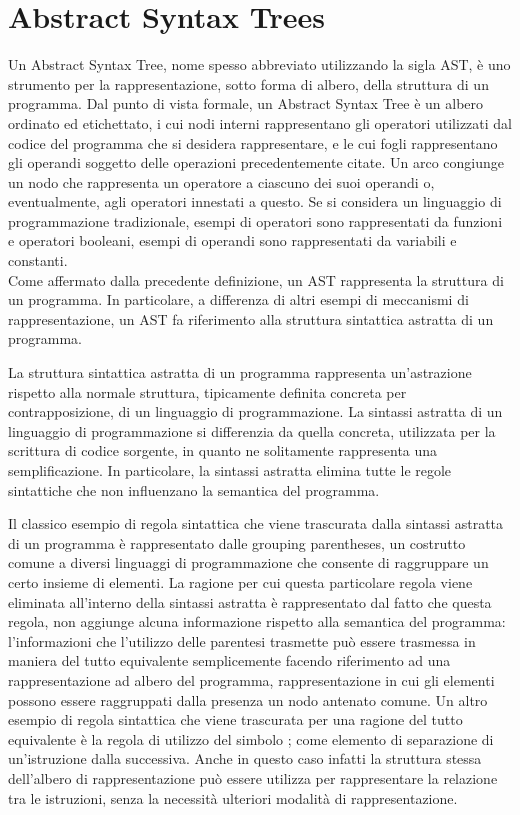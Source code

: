 \section{Abstract Syntax Trees}

Un Abstract Syntax Tree, nome spesso abbreviato utilizzando la sigla AST, è uno
strumento per la rappresentazione, sotto forma di albero, della struttura di un
programma. Dal punto di vista formale, un Abstract Syntax Tree è un albero
ordinato ed etichettato, i cui nodi interni rappresentano gli operatori
utilizzati dal codice del programma che si desidera rappresentare, e le cui
fogli rappresentano gli operandi soggetto delle operazioni precedentemente
citate. Un arco congiunge un nodo che rappresenta un operatore a ciascuno dei
suoi operandi o, eventualmente, agli operatori innestati a questo. Se si
considera un linguaggio di programmazione tradizionale, esempi di operatori
sono rappresentati da funzioni e operatori booleani, esempi di operandi sono
rappresentati da variabili e constanti.\\

Come affermato dalla precedente definizione, un AST rappresenta la struttura di
un programma. In particolare, a differenza di altri esempi di meccanismi di
rappresentazione, un AST fa riferimento alla struttura sintattica astratta di
un programma.

La struttura sintattica astratta di un programma rappresenta un’astrazione
rispetto alla normale struttura, tipicamente definita concreta per
contrapposizione, di un linguaggio di programmazione. La sintassi astratta di
un linguaggio di programmazione si differenzia da quella concreta,  utilizzata
per la scrittura di codice sorgente, in quanto ne solitamente rappresenta una
semplificazione. In particolare, la sintassi astratta elimina tutte le regole
sintattiche che non influenzano la semantica del programma.

Il classico esempio di regola sintattica che viene trascurata dalla sintassi
astratta di un programma è rappresentato dalle grouping parentheses, un
costrutto comune a diversi linguaggi di programmazione che consente di
raggruppare un certo insieme di elementi. La ragione per cui questa particolare
regola viene eliminata all’interno della sintassi astratta è rappresentato dal
fatto che questa regola, non aggiunge alcuna informazione rispetto alla
semantica del programma: l’informazioni che l’utilizzo delle parentesi
trasmette può essere trasmessa in maniera del tutto equivalente semplicemente
facendo riferimento ad una rappresentazione ad albero del programma,
rappresentazione in cui gli elementi possono essere raggruppati dalla presenza
un nodo antenato comune. Un altro esempio di regola sintattica che viene
trascurata per una ragione del tutto equivalente è la regola di utilizzo del
simbolo ; come elemento di separazione di un’istruzione dalla successiva. Anche
in questo caso infatti la struttura stessa dell’albero di rappresentazione può
essere utilizza per rappresentare la relazione tra le istruzioni, senza la
necessità ulteriori modalità di rappresentazione.\\

